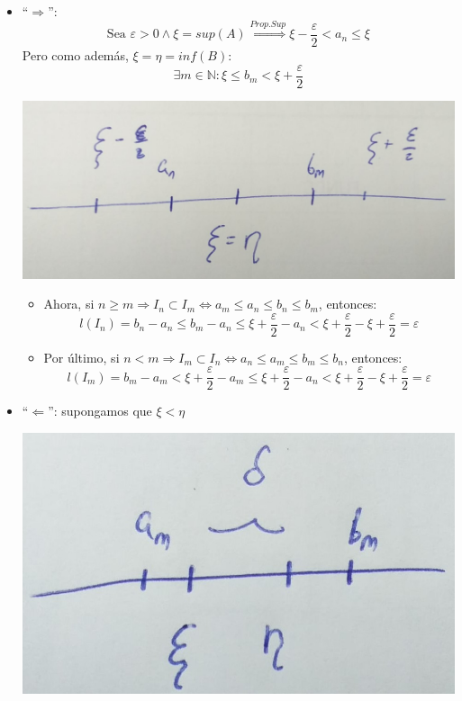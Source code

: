 \documentclass[10pt,a4paper,openright]{book}
\theoremstyle{break}
\begin{document}
\begin{itemize}
\item ``$\Rightarrow$'':
$$\mbox{Sea }\varepsilon>0\wedge \xi=sup(A)\stackrel{Prop. Sup}{\Rightarrow} \xi-\frac{\varepsilon}{2}<a_n\leq \xi$$
Pero como además, $\xi=\eta=inf(B)$:
$$\exists m \in \mathbb N: \xi\leq b_m< \xi+ \frac{\varepsilon}{2}$$

\begin{center}
\includegraphics[scale=0.25]{corolario cantor}
\end{center}

	\begin{itemize}
	\item Ahora, si $n\geq m\Rightarrow I_n\subset I_m\Leftrightarrow a_m\leq a_n\leq b_n\leq b_m$, entonces:
$$l(I_n)=b_n-a_n\leq b_m-a_n\leq \xi+ \frac{\varepsilon}{2}-a_n<\xi+ \frac{\varepsilon}{2}-\xi+ \frac{\varepsilon}{2}=\varepsilon$$

	\item Por último, si $n<m\Rightarrow I_m\subset I_n\Leftrightarrow a_n\leq a_m\leq b_m\leq b_n$, entonces:
$$l(I_m)=b_m-a_m< \xi+\frac{\varepsilon}{2}-a_m\leq \xi+\frac{\varepsilon}{2}-a_n<\xi+\frac{\varepsilon}{2}-\xi+\frac{\varepsilon}{2}=\varepsilon$$
	\end{itemize}

\item ``$\Leftarrow$'': supongamos que $\xi<\eta$

\begin{center}
\includegraphics[scale=0.25]{corolario cantor 2}
\end{center}


\end{itemize}
\end{document}
